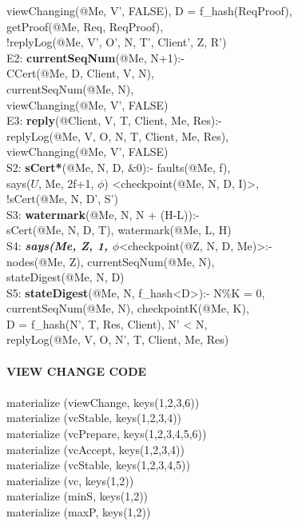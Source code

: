 \begin{code}
\> viewChanging(@Me, V', FALSE), D = f\_hash(ReqProof),\\
\> getProof(@Me, Req, ReqProof),\\
\> !replyLog(@Me, V', O', N, T', Client', Z, R')\\
E2: \textbf{currentSeqNum}(@Me, N+1):-\\
\> CCert(@Me, D, Client, V, N),\\
\> currentSeqNum(@Me, N), \\
\> viewChanging(@Me, V', FALSE)\\
E3: \textbf{reply}(@Client, V, T, Client, Me, Res):-\\
\> replyLog(@Me, V, O, N, T, Client, Me, Res),\\
\> viewChanging(@Me, V', FALSE)\\
S2: \textbf{sCert*}(@Me, N, D, $\&0$):- faults(@Me, f),\\
\> says($U$, Me, 2f+1, $\phi$) <checkpoint(@Me, N, D, I)>, \\
\> !sCert(@Me, N, D', S')\\
S3: \textbf{watermark}(@Me, N, N + (H-L)):- \\
\> sCert(@Me, N, D, T), watermark(@Me, L, H)\\
S4: \textbf{\textit{says(Me, Z, 1, $\phi$}}<checkpoint(@Z, N, D, Me)>:-\\
\> nodes(@Me, Z), currentSeqNum(@Me, N), \\
\> stateDigest(@Me, N, D)\\
S5: \textbf{stateDigest}(@Me, N, f\_hash<D>):- N\%K = 0,\\
\> currentSeqNum(@Me, N), checkpointK(@Me, K), \\
\> D = f\_hash(N', T, Res, Client), N' < N,\\
\> replyLog(@Me, V, O, N', T, Client, Me, Res)\\
\\
{\bf VIEW CHANGE CODE}\\
\\
materialize (viewChange, keys(1,2,3,6))\\
materialize (vcStable, keys(1,2,3,4))\\
materialize (vcPrepare, keys(1,2,3,4,5,6))\\
materialize (vcAccept, keys(1,2,3,4))\\
materialize (vcStable, keys(1,2,3,4,5))\\
materialize (vc, keys(1,2))\\
materialize (minS, keys(1,2))\\
materialize (maxP, keys(1,2))\\

\end{code}
